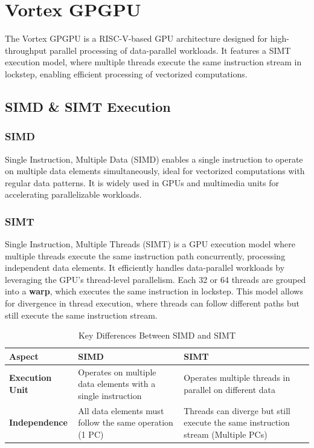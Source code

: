 \documentclass[12pt]{report}
\begin{document}
\chapter{Vortex GPGPU}

The Vortex GPGPU is a RISC-V-based GPU architecture designed for high-throughput parallel processing of data-parallel workloads. It features a SIMT execution model, where multiple threads execute the same instruction stream in lockstep, enabling efficient processing of vectorized computations.

\section{SIMD \& SIMT Execution}

\subsection{SIMD}  
Single Instruction, Multiple Data (SIMD) enables a single instruction to operate on multiple data elements simultaneously, ideal for vectorized computations with regular data patterns. It is widely used in GPUs and multimedia units for accelerating parallelizable workloads. 

\subsection{SIMT}  
Single Instruction, Multiple Threads (SIMT) is a GPU execution model where multiple threads execute the same instruction path concurrently, processing independent data elements. It efficiently handles data-parallel workloads by leveraging the GPU's thread-level parallelism. Each 32 or 64 threads are grouped into a \textbf{warp}, which executes the same instruction in lockstep. This model allows for divergence in thread execution, where threads can follow different paths but still execute the same instruction stream.

\begin{table}[H]
    \centering
    \caption{Key Differences Between SIMD and SIMT}
    \begin{tabular}{|>{\centering\arraybackslash}m{}|>{\centering\arraybackslash}m{}|>{\centering\arraybackslash}m{}|}
        \hline 
        \textbf{Aspect} & \textbf{SIMD} & \textbf{SIMT} \\
        \hline
        \textbf{Execution Unit} & Operates on multiple data elements with a single instruction & Operates multiple threads in parallel on different data \\
        \hline
        \textbf{Independence} & All data elements must follow the same operation (1 PC) & Threads can diverge but still execute the same instruction stream (Multiple PCs) \\
        \hline
    \end{tabular}
    \label{tab:simd_vs_simt}
\end{table}
\end{document}
